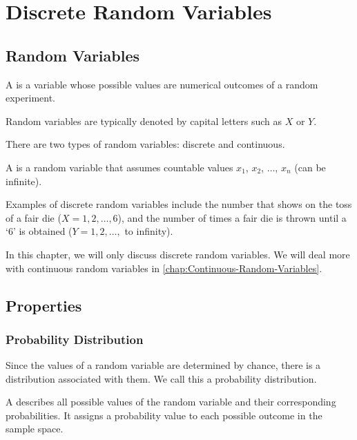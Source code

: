 \chapter{Discrete Random Variables}

\section{Random Variables}

\begin{definition}
    A  is a variable whose possible values are numerical outcomes of a random experiment.
\end{definition}

Random variables are typically denoted by capital letters such as $X$ or $Y$.

There are two types of random variables: discrete and continuous.

\begin{definition}
    A  is a random variable that assumes countable values $x_1$, $x_2$, $\dots$, $x_n$ (can be infinite).
\end{definition}

Examples of discrete random variables include the number that shows on the toss of a fair die ($X = 1, 2, \dots, 6$), and the number of times a fair die is thrown until a `6' is obtained ($Y = 1, 2, \dots,$ to infinity).

In this chapter, we will only discuss discrete random variables. We will deal more with continuous random variables in \SS\ref{chap:Continuous-Random-Variables}.

\section{Properties}

\subsection{Probability Distribution}

Since the values of a random variable are determined by chance, there is a distribution associated with them. We call this a probability distribution.

\begin{definition}
    A  describes all possible values of the random variable and their corresponding probabilities. It assigns a probability value to each possible outcome in the sample space.
\end{definition}

